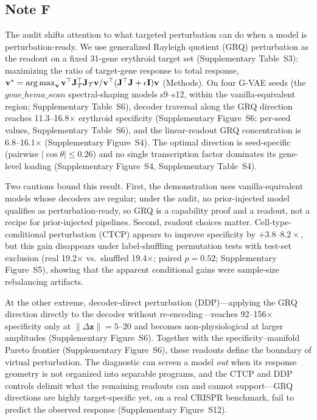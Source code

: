 \documentclass[11 pt,a4 paper]{article}
\DeclareMathOperator*{\argmax}{arg\,max}\DeclareMathOperator*{\argmin}{arg\,min}
\begin{document}
\clearpage

\subsection*{Note F}

The audit shifts attention to what targeted perturbation can do when a model is perturbation-ready. We use generalized Rayleigh quotient (GRQ) perturbation as the readout on a fixed 31-gene erythroid target set (Supplementary Table~S3): maximizing the ratio of target-gene response to total response, $\mathbf{v}^* = \argmax_{\mathbf{v}} \mathbf{v}^\top\Jmat_{\mathcal{T}}^\top\Jmat_{\mathcal{T}}\mathbf{v} / \mathbf{v}^\top(\Jmat^\top\Jmat+\epsilon\mathbf{I})\mathbf{v}$ (Methods). On four G-VAE seeds (the $gvae\_hema\_scan$ spectral-shaping models s9--s12, within the vanilla-equivalent region; Supplementary Table~S6), decoder traversal along the GRQ direction reaches 11.3--16.8$\times$ erythroid specificity (Supplementary Figure~S6; per-seed values, Supplementary Table~S6), and the linear-readout GRQ concentration is 6.8--16.1$\times$ (Supplementary Figure~S4). The optimal direction is seed-specific (pairwise $|\cos\theta|\le0.26$) and no single transcription factor dominates its gene-level loading (Supplementary Figure~S4, Supplementary Table~S4).

Two cautions bound this result. First, the demonstration uses vanilla-equivalent models whose decoders are regular; under the audit, no prior-injected model qualifies as perturbation-ready, so GRQ is a capability proof and a readout, not a recipe for prior-injected pipelines. Second, readout choices matter. Cell-type-conditional perturbation (CTCP) appears to improve specificity by $+3.8$--$8.2\times$, but this gain disappears under label-shuffling permutation tests with test-set exclusion (real 19.2$\times$ vs.\ shuffled 19.4$\times$; paired $p=0.52$; Supplementary Figure~S5), showing that the apparent conditional gains were sample-size rebalancing artifacts.

At the other extreme, decoder-direct perturbation (DDP)---applying the GRQ direction directly to the decoder without re-encoding---reaches 92--156$\times$ specificity only at $\|\Delta\mathbf{z}\|=5$--$20$ and becomes non-physiological at larger amplitudes (Supplementary Figure~S6). Together with the specificity--manifold Pareto frontier (Supplementary Figure~S6), these readouts define the boundary of virtual perturbation. The diagnostic can screen a model \emph{out} when its response geometry is not organized into separable programs, and the CTCP and DDP controls delimit what the remaining readouts can and cannot support---GRQ directions are highly target-specific yet, on a real CRISPR benchmark, fail to predict the observed response (Supplementary Figure~S12).
\end{document}
